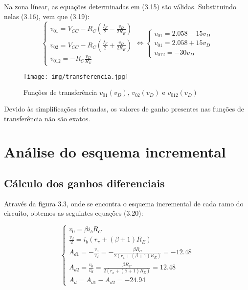 \documentclass[a4paper,2pt]{report}
\begin{document}
\par Na zona línear, as equações determinadas em (3.15) são válidas. Substituindo nelas (3.16), vem que (3.19):
\begin{equation}
    \begin{cases}
        v_{01} = V_{CC} - R_C(\frac{I_F}{2} - \frac{v_D}{2R_E}) \\
        v_{02} = V_{CC} - R_C(\frac{I_F}{2} + \frac{v_D}{2R_E}) \\
        v_{012} = - R_C \frac{v_D}{R_E}
    \end{cases}
    \Leftrightarrow
    \begin{cases}
        v_{01} = 2.058 - 15 v_D \\
        v_{01} = 2.058 + 15 v_D \\
        v_{012} = -30v_D
    \end{cases}
\end{equation}

\begin{figure}[H]
    \centering
    \texttt{[image: img/transferencia.jpg]}
    \caption{Funções de transferência \(v_{01}(v_D)\), \(v_{02}(v_D)\) e \(v_{012}(v_D)\)}
    \label{}
\end{figure}

\par Devido às simplificações efetuadas, os valores de ganho presentes nas funções de transferência não são exatos.

\section{Análise do esquema incremental}
\subsection{Cálculo dos ganhos diferenciais}

\par Através da figura 3.3, onde se encontra o esquema incremental de cada ramo do circuito, obtemos as seguintes equações (3.20):

\begin{equation}
    \begin{cases}
        v_0 = \beta i_b R_C \\
        \frac{v_d}{2} = i_b(r_\pi + (\beta + 1)R_E) \\
        A_{d1} = -\frac{v_0}{v_d} = -\frac{\beta R_C}{2(r_\pi + (\beta + 1)R_E)} = -12.48 \\
        A_{d2} = \frac{v_0}{v_d} = \frac{\beta R_C}{2(r_\pi + (\beta + 1)R_E)} = 12.48 \\
        A_d = A_{d1} - A_{d2} = -24.94
    \end{cases}
\end{equation}
\end{document}
